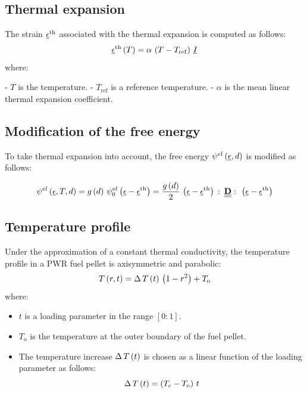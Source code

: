 \subsection{Thermal expansion}

The strain \(\underline{\epsilon}^{\mathrm{th}}\) associated with the thermal expansion is
computed as follows:
\[
\underline{\epsilon}^{\mathrm{th}}\left(T\right)=\alpha\,\left(T-T_{\mathrm{ref}}\right)\,\underline{I}
\]
where:

- \(T\) is the temperature.
- \(T_{\mathrm{ref}}\) is a reference temperature.
- \(\alpha\) is the mean linear thermal expansion coefficient.

\subsection{Modification of the free energy}

To take thermal expansion into account, the free energy
\({\psi}^{el}\left(\underline{\epsilon}, d\right)\) is modified as follows:

\begin{equation}
  \label{eq:micromorphicdamage:freeenergygel}
  {\psi}^{el}\left(\underline{\epsilon}, T, d\right) = 
  g\left(d\right)\,{\psi}^{el}_{0}\left(\underline{\epsilon}-\underline{\epsilon}^{\mathrm{th}}\right) =
  \displaystyle \frac{\displaystyle g\left(d\right)}{\displaystyle 2}\,\left(\underline{\epsilon}-\underline{\epsilon}^{\mathrm{th}}\right)\,\colon\,\underline{\underline{\mathbf{D}}}\,\colon\,\left(\underline{\epsilon}-\underline{\epsilon}^{\mathrm{th}}\right)
\end{equation}


\subsection{Temperature profile}

Under the approximation of a constant thermal conductivity, the
temperature profile in a PWR fuel pellet is axisymmetric and parabolic:
\[
T\left(r, t\right)=\Delta\,T\left(t\right)\,\left(1-r^{2}\right)+T_{\mathrm{o}}
\]
where:

\begin{itemize}
  \item \(t\) is a loading parameter in the range \([0:1]\).
  \item \(T_{\mathrm{o}}\) is the temperature at the outer boundary of the
    fuel pellet.
  \item The temperature increase \(\Delta\,T\left(t\right)\) is chosen as a linear
    function of the loading parameter as follows:
    \[
    \Delta\,T\left(t\right) = \left(T_{\mathrm{c}}-T_{\mathrm{o}}\right)\, t
    \]
\end{itemize}

